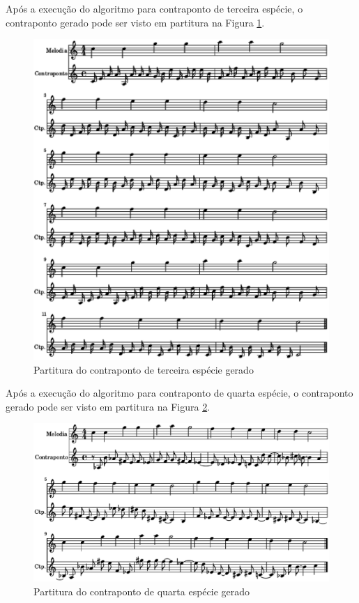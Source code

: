     Após a execução do algoritmo para contraponto de terceira espécie, o contraponto gerado pode ser visto em partitura na Figura \ref{cont3.2}.

    \begin{figure}[htb]
      \centering
      \includegraphics[scale=0.6]{figuras/cont3.2.eps}
      \caption{Partitura do contraponto de terceira espécie gerado}
      \label{cont3.2}
    \end{figure}

    Após a execução do algoritmo para contraponto de quarta espécie, o contraponto gerado pode ser visto em partitura na Figura \ref{cont4.2}.

    \begin{figure}[htb]
      \centering
      \includegraphics[scale=0.6]{figuras/cont4.2.eps}
      \caption{Partitura do contraponto de quarta espécie gerado}
      \label{cont4.2}
    \end{figure}
